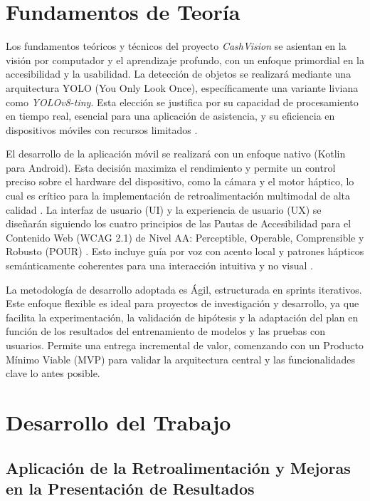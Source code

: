 \documentclass[10pt,a4paper]{report}
\begin{document}
\chapter{Fundamentos de Teoría}

Los fundamentos teóricos y técnicos del proyecto \textit{CashVision} se asientan en la visión por computador y el aprendizaje profundo, con un enfoque primordial en la accesibilidad y la usabilidad. La detección de objetos se realizará mediante una arquitectura YOLO (You Only Look Once), específicamente una variante liviana como \textit{YOLOv8-tiny}. Esta elección se justifica por su capacidad de procesamiento en tiempo real, esencial para una aplicación de asistencia, y su eficiencia en dispositivos móviles con recursos limitados \cite{v7labs_yolo_explained}.

El desarrollo de la aplicación móvil se realizará con un enfoque nativo (Kotlin para Android). Esta decisión maximiza el rendimiento y permite un control preciso sobre el hardware del dispositivo, como la cámara y el motor háptico, lo cual es crítico para la implementación de retroalimentación multimodal de alta calidad \cite{uptech_native_vs_cross_platform}. La interfaz de usuario (UI) y la experiencia de usuario (UX) se diseñarán siguiendo los cuatro principios de las Pautas de Accesibilidad para el Contenido Web (WCAG 2.1) de Nivel AA: Perceptible, Operable, Comprensible y Robusto (POUR) \cite{w3c_wcag21}. Esto incluye guía por voz con acento local y patrones hápticos semánticamente coherentes para una interacción intuitiva y no visual \cite{uxdesign_voice_ui_accessibility, muzli_haptic_ux}.

La metodología de desarrollo adoptada es Ágil, estructurada en sprints iterativos. Este enfoque flexible es ideal para proyectos de investigación y desarrollo, ya que facilita la experimentación, la validación de hipótesis y la adaptación del plan en función de los resultados del entrenamiento de modelos y las pruebas con usuarios. Permite una entrega incremental de valor, comenzando con un Producto Mínimo Viable (MVP) para validar la arquitectura central y las funcionalidades clave lo antes posible.

\newpage

\chapter{Desarrollo del Trabajo}

\section{Aplicación de la Retroalimentación y Mejoras en la Presentación de Resultados}
\end{document}
